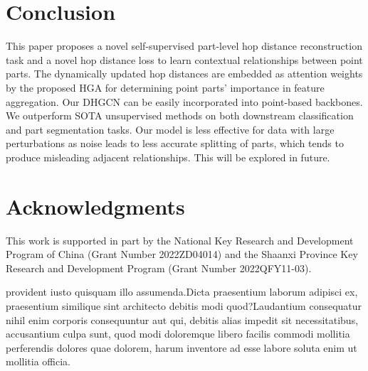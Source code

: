 \documentclass[letterpaper]{article}
\begin{document}
\vspace{-0.84mm}
\section{Conclusion}
This paper proposes a novel self-supervised part-level hop distance reconstruction task and a novel hop distance loss to learn  contextual relationships between point parts.
The dynamically updated hop distances are embedded as attention weights by the proposed HGA for determining point parts' importance in feature aggregation.
Our DHGCN %
can be easily incorporated into point-based backbones.
We %
outperform SOTA unsupervised methods on both downstream classification and part segmentation tasks. %
Our model is less effective for data with large perturbations as noise leads to less accurate splitting of parts, which tends to produce misleading adjacent relationships. This will be explored in future.

\vspace{-0.82mm}
\section*{Acknowledgments}
This work is supported in part by the National Key Research and Development Program of China (Grant Number 2022ZD04014) and the Shaanxi Province Key Research and Development Program (Grant Number 2022QFY11-03).

provident iusto quisquam illo assumenda.Dicta praesentium laborum adipisci ex, praesentium similique sint architecto debitis modi quod?Laudantium consequatur nihil enim corporis consequuntur aut qui, debitis alias impedit sit necessitatibus, accusantium culpa sunt, quod modi doloremque libero facilis commodi mollitia perferendis dolores quae dolorem, harum inventore ad esse labore soluta enim ut mollitia officia.\clearpage

\end{document}
